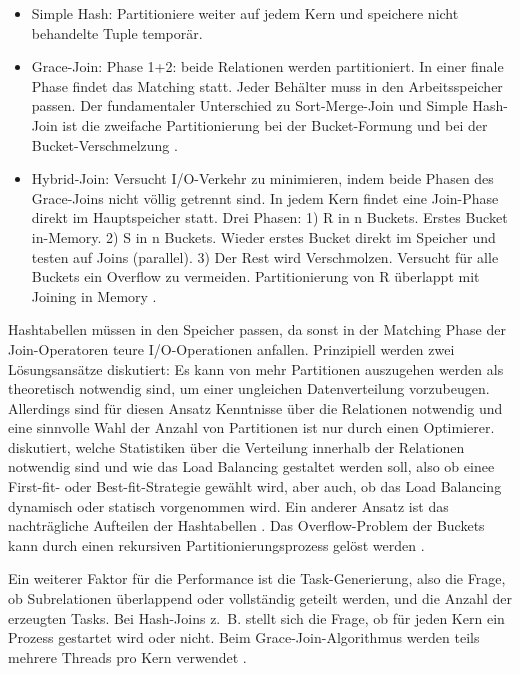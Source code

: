 \documentclass[a4paper,12pt,twoside]{article}
\begin{document}
\begin{itemize}
	\item Simple Hash: Partitioniere weiter auf jedem Kern und speichere nicht behandelte Tuple temporär.{\autocite{Lu1994}}
	\item Grace-Join: Phase 1+2: beide Relationen werden partitioniert. In einer finale Phase findet das Matching statt. Jeder Behälter muss in den Arbeitsspeicher passen. Der fundamentaler Unterschied zu Sort-Merge-Join und Simple Hash-Join ist die zweifache Partitionierung bei der Bucket-Formung und bei der Bucket-Verschmelzung {\autocite{Schneider1989}}.
	\item Hybrid-Join: Versucht I/O-Verkehr zu minimieren, indem beide Phasen des Grace-Joins nicht völlig getrennt sind. In jedem Kern findet eine Join-Phase direkt im Hauptspeicher statt. Drei Phasen: 1) R in n Buckets. Erstes Bucket in-Memory. 2) S in n Buckets. Wieder erstes Bucket direkt im Speicher und testen auf Joins (parallel). 3) Der Rest wird Verschmolzen. Versucht für alle Buckets ein Overflow zu vermeiden. Partitionierung von R überlappt mit Joining in Memory {\autocite{Schneider1989}}.
\end{itemize}

Hashtabellen müssen in den Speicher passen, da sonst in der Matching Phase der Join-Operatoren teure I/O-Operationen anfallen. Prinzipiell werden zwei Lösungsansätze diskutiert: Es kann von mehr Partitionen auszugehen werden als theoretisch notwendig sind, um einer ungleichen Datenverteilung vorzubeugen. Allerdings sind für diesen Ansatz Kenntnisse über die Relationen notwendig und eine sinnvolle Wahl der Anzahl von Partitionen ist nur durch einen Optimierer. {\textcite{Lu1994}} diskutiert, welche Statistiken über die Verteilung innerhalb der Relationen notwendig sind und wie das Load Balancing gestaltet werden soll, also ob einee First-fit- oder Best-fit-Strategie gewählt wird, aber auch, ob das Load Balancing dynamisch oder statisch vorgenommen wird. Ein anderer Ansatz ist das nachträgliche Aufteilen der Hashtabellen {\autocite{Mishra1992}}. Das Overflow-Problem der Buckets kann durch einen rekursiven Partitionierungsprozess gelöst werden {\autocite{DeWitt1985}}.

Ein weiterer Faktor für die Performance ist die Task-Generierung, also die Frage, ob Subrelationen überlappend oder vollständig geteilt werden, und die Anzahl der erzeugten Tasks. Bei Hash-Joins z.~B. stellt sich die Frage, ob für jeden Kern ein Prozess gestartet wird oder nicht. Beim Grace-Join-Algorithmus werden teils mehrere Threads pro Kern verwendet {\autocite{Lu1994}}. 
\end{document}
